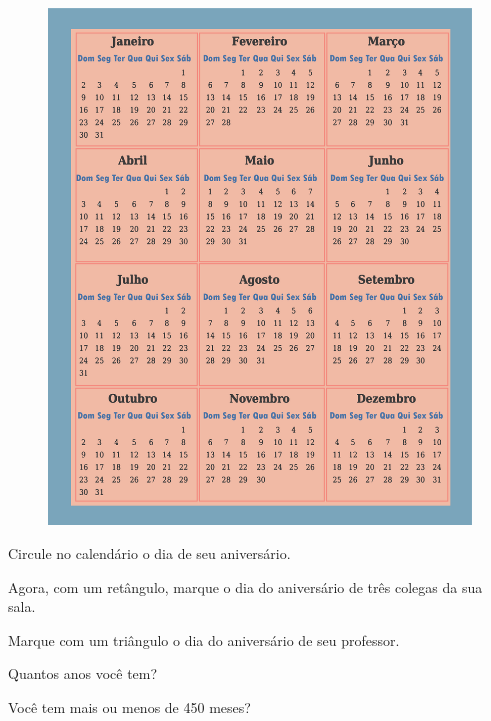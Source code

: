 \begin{figure}[htpb!]
\includegraphics[width=\textwidth]{./media/image54.png}
\end{figure}

\begin{escolha}
\item Circule no calendário o dia de seu aniversário.

\item Agora, com um retângulo, marque o dia do aniversário de três colegas da sua sala.

\item Marque com um triângulo o dia do aniversário de seu professor.

\item Quantos anos você tem?

\item Você tem mais ou menos de 450 meses?
\end{escolha}

